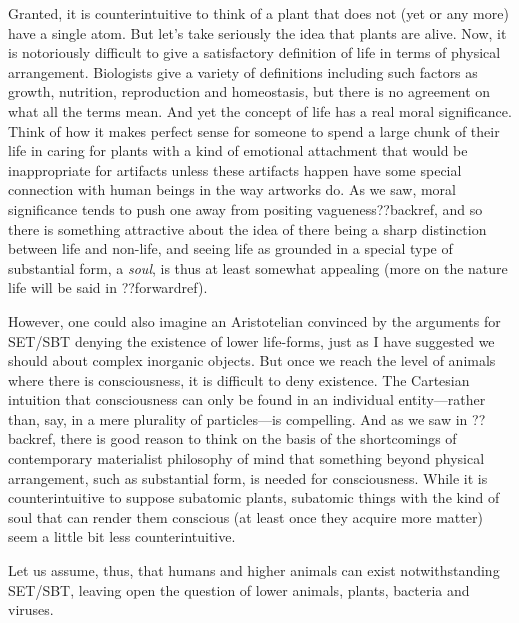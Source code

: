Granted, it is counterintuitive to think of a plant that does not (yet or any more) have a single atom. But let's take
seriously the idea that plants are alive. Now, it is notoriously difficult to give a satisfactory
definition of life in terms of physical arrangement. Biologists give a variety of definitions including
such factors as growth, nutrition, reproduction and homeostasis, but there is no agreement on what all the
terms mean. And yet the concept of life has a real moral significance. Think of how it makes perfect sense for
someone to spend a large chunk of their life in caring for plants with a kind of emotional attachment that
would be inappropriate for artifacts unless these artifacts happen have some special connection with human beings
in the way artworks do. As we saw, moral significance tends to push one away from positing vagueness??backref, and so there is something
attractive about the idea of there being a sharp distinction between life and non-life, and seeing life
as grounded in a special type of substantial form, a \textit{soul}, is thus at least somewhat appealing (more
on the nature life will be said in ??forwardref).

However, one could also imagine an Aristotelian convinced by the arguments for SET/SBT denying the existence
of lower life-forms, just as I have suggested we should about complex inorganic objects. But once we reach 
the level of animals where there is consciousness, it is difficult to deny existence. The Cartesian intuition
that consciousness can only be found in an individual entity---rather than, say, in a mere plurality of particles---is
compelling. And as we saw in ??backref, there is good reason to think on the basis of the shortcomings of 
contemporary materialist philosophy of mind that something beyond physical arrangement, such as substantial form, 
is needed for consciousness. While it is counterintuitive to suppose subatomic plants, subatomic things with the
kind of soul that can render them conscious (at least once they acquire more matter) seem a little bit less 
counterintuitive.

Let us assume, thus, that humans and higher animals can exist notwithstanding SET/SBT, leaving open the question
of lower animals, plants, bacteria and viruses. 

